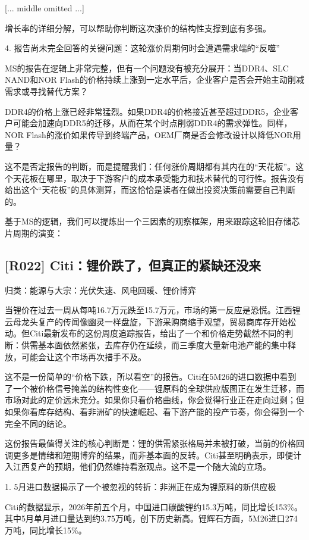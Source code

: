 \documentclass[11pt]{ctexart}
\begin{document}
[... middle omitted ...]

增长率的详细分解，可以帮助你判断这次涨价的结构性支撑到底有多强。

4. 报告尚未完全回答的关键问题：这轮涨价周期何时会遭遇需求端的“反噬”

MS的报告在逻辑上非常完整，但有一个问题没有被充分展开：当DDR4、SLC NAND和NOR Flash的价格持续上涨到一定水平后，企业客户是否会开始主动削减需求或寻找替代方案？

DDR4的价格上涨已经非常猛烈。如果DDR4的价格接近甚至超过DDR5，企业客户可能会加速向DDR5的迁移，从而在某个时点削弱DDR4的需求弹性。同样，NOR Flash的涨价如果传导到终端产品，OEM厂商是否会修改设计以降低NOR用量？

这不是否定报告的判断，而是提醒我们：任何涨价周期都有其内在的“天花板”。这个天花板在哪里，取决于下游客户的成本承受能力和技术替代的可行性。报告没有给出这个“天花板”的具体测算，而这恰恰是读者在做出投资决策前需要自己判断的。

基于MS的逻辑，我们可以提炼出一个三因素的观察框架，用来跟踪这轮旧存储芯片周期的演变：

\subsection{[R022] Citi：锂价跌了，但真正的紧缺还没来}
{\small\color{refgray}归类：能源与大宗：光伏失速、风电回暖、锂价博弈}

当锂价在过去一周从每吨16.7万元跌至15.7万元，市场的第一反应是恐慌。江西锂云母龙头复产的传闻像幽灵一样盘旋，下游采购商缩手观望，贸易商库存开始松动。但Citi最新发布的这份周度追踪报告，给出了一个和价格走势截然不同的判断：供需基本面依然紧张，去库存仍在延续，而三季度大量新电池产能的集中释放，可能会让这个市场再次措手不及。

这不是一份简单的“价格下跌，所以看空”的报告。Citi在5M26的进口数据中看到了一个被价格信号掩盖的结构性变化——锂原料的全球供应版图正在发生迁移，而市场对此的定价远未充分。如果你只看价格曲线，你会觉得行业正在走向过剩；但如果你看库存结构、看非洲矿的快速崛起、看下游产能的投产节奏，你会得到一个完全不同的结论。

这份报告最值得关注的核心判断是：锂的供需紧张格局并未被打破，当前的价格回调更多是情绪和短期博弈的结果，而非基本面的反转。Citi甚至明确表示，即便计入江西复产的预期，他们仍然维持看涨观点。这不是一个随大流的立场。

1. 5月进口数据揭示了一个被忽视的转折：非洲正在成为锂原料的新供应极

Citi的数据显示，2026年前五个月，中国进口碳酸锂约15.3万吨，同比增长153\%。其中5月单月进口量达到约3.75万吨，创下历史新高。锂辉石方面，5M26进口274万吨，同比增长15\%。
\end{document}
